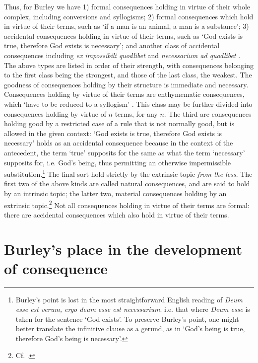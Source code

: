 	Thus, for Burley we have 1) formal consequences holding in virtue of their whole complex, including conversions and syllogisms; 2) formal consequences which hold in virtue of their terms, such as `if a man is an animal, a man is a substance'; 3) accidental consequences holding in virtue of their terms, such as `God exists is true, therefore God exists is necessary'; and another class of accidental consequences including \textit{ex impossibili quodlibet} and \textit{necessarium ad quodlibet} \autocite[pp. 128-129, par. 70]{Green-Pedersen1980b}. The above types are listed in order of their strength, with consequences belonging to the first class being the strongest, and those of the last class, the weakest. The goodness of consequences holding by their structure is immediate and necessary. Consequences holding by virtue of their terms are enthymematic consequences, which `have to be reduced to a syllogism' \autocite[p. 142, par. 117]{Green-Pedersen1980b}. This class may be further divided into consequences holding by virtue of $n$ terms, for any $n$. The third are consequences holding good by a restricted case of a rule that is not normally good, but is allowed in the given context: `God exists is true, therefore God exists is necessary' holds as an accidental consequence because in the context of the antecedent, the term `true' supposits for the same as what the term `necessary' supposits for, i.e. God's being, thus permitting an otherwise impermissible substitution.\footnote{Burley's point is lost in the most straightforward English reading of \textit{Deum esse est verum, ergo deum esse est necessarium}. i.e. that where \textit{Deum esse} is taken for the sentence `God exists'. To preserve Burley's point, one might better translate the infinitive clause as a gerund, as in `God's being is true, therefore God's being is necessary'.} The final sort hold strictly by the extrinsic topic \textit{from the less}. The first two of the above kinds are called natural consequences, and are said to hold by an intrinsic topic; the latter two, material consequences holding by an extrinsic topic.\footnote{Cf. \autocite[p. 130]{Martin2004}.} Not all consequences holding in virtue of their terms are formal: there are accidental consequences which also hold in virtue of their terms.	
	\section{Burley's place in the development of consequence}
